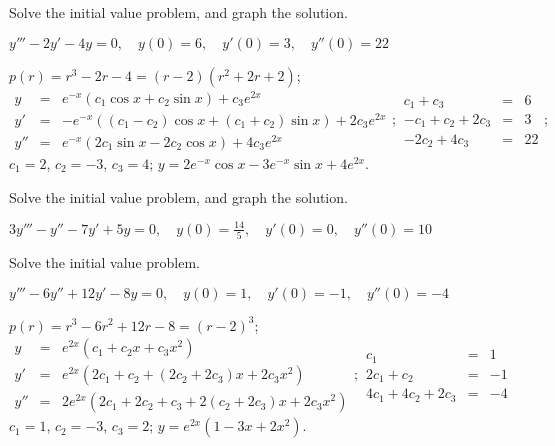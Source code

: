 \documentclass{ximera}
\begin{document}
\begin{problem}\label{exer:9.2.18} Solve the
initial value problem, and graph the solution.

$y'''-2y'-4y=0, \quad  y(0)=6,\quad y'(0)=3,\quad y''(0)=22$

\begin{solution}
$p(r)=r^3-2r-4=(r-2)(r^2+2r+2)$;
$$
\begin{array}{lcl}
y&=&e^{-x}(c_1\cos x+c_2\sin x)+c_3e^{2x}\\
y'&=&-e^{-x}((c_1-c_2)\cos x+(c_1+c_2)\sin x)+2c_3e^{2x}\\
y''&=&e^{-x}(2c_1\sin x-2c_2\cos x)+4c_3e^{2x}
\end{array};
\begin{array}{rcr}
c_1+c_3&=&6\\
-c_1+c_2+2c_3&=&3\\
-2c_2+4c_3&=&22
\end{array};
$$
$c_1=2$, $c_2=-3$, $c_3=4$;
 $y=2e^{-x}\cos x-3e^{-x}\sin x+4e^{2x}$.
\end{solution}
\end{problem}

\begin{problem}\label{exer:9.2.19} Solve the
initial value problem, and graph the solution.

$3y'''-y''-7y'+5y=0, \quad  y(0)=\frac{14}{5},\quad y'(0)=0,\quad y''(0)=10$
\end{problem}

\begin{problem}\label{exer:9.2.20}  Solve the
initial value problem.

$y'''-6y''+12y'-8y=0, \quad  y(0)=1,\quad y'(0)=-1,\quad y''(0)=-4$

\begin{solution}
$p(r)=r^3-6r^2+12r-8=(r-2)^3$;
$$
\begin{array}{lcl}
y&=&e^{2x}(c_1+c_2x+c_3x^2)\\
y'&=&e^{2x}(2c_1+c_2+(2c_2+2c_3)x+2c_3x^2)\\
y''&=&2e^{2x}(2c_1+2c_2+c_3+2(c_2+2c_3)x+2c_3x^2)
\end{array};
\begin{array}{rcr}
c_1&=&1\\
2c_1+c_2&=&-1\\
4c_1+4c_2+2c_3&=&-4
\end{array}
$$
$c_1=1$, $c_2=-3$, $c_3=2$;
 $y=e^{2x}(1-3x+2x^2)$.
\end{solution}
\end{problem}
\end{document}
